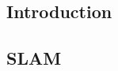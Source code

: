 \chapter{\chapthreetitle}

\section{Introduction}
\label{sec:chap3_intro}

\section{SLAM}
\label{sec:slam}





